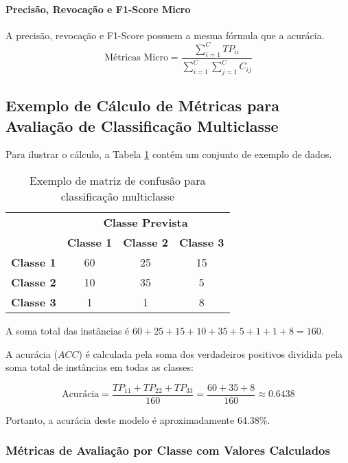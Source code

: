 \paragraph{Precisão, Revocação e F1-Score Micro}
A precisão, revocação e F1-Score possuem a mesma fórmula que a acurácia.
\[ \text{Métricas Micro} = \frac{\sum_{i=1}^{C} TP_{ii}}{\sum_{i=1}^{C} \sum_{j=1}^{C} C_{ij}} \]


\subsection{Exemplo de Cálculo de Métricas para Avaliação de Classificação Multiclasse}

Para ilustrar o cálculo, a Tabela \ref{tab:confusion_matrix_multiclass_example} contém um conjunto de exemplo de dados.

\begin{table}[h]
\centering
\caption{Exemplo de matriz de confusão para classificação multiclasse}
\label{tab:confusion_matrix_multiclass_example}
\begin{tabular}{c|c|c|c}
\multicolumn{1}{c}{} & \multicolumn{3}{c}{\textbf{Classe Prevista}} \\ \cline{2-4} 
\multicolumn{1}{c|}{} & \textbf{Classe 1} & \textbf{Classe 2} & \textbf{Classe 3} \\ \hline
\textbf{Classe 1} & 60 & 25 & 15 \\ \hline
\textbf{Classe 2} & 10 & 35 & 5 \\ \hline
\textbf{Classe 3} & 1 & 1 & 8 \\ \hline
\end{tabular}
\end{table}

A soma total das instâncias é \(60 + 25 + 15 + 10 + 35 + 5 + 1 + 1 + 8 = 160\).

A acurácia (\(ACC\)) é calculada pela soma dos verdadeiros positivos dividida pela soma total de instâncias em todas as classes:

\[ \text{Acurácia} = \frac{TP_{11} + TP_{22} + TP_{33}}{160} = \frac{60 + 35 + 8}{160} \approx 0.6438 \]

Portanto, a acurácia deste modelo é aproximadamente 64.38\%.

\subsubsection{Métricas de Avaliação por Classe com Valores Calculados}

